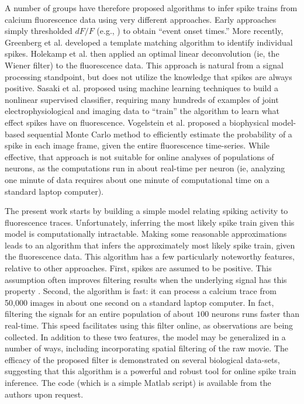 \documentclass{article}
\begin{document}
A number of groups have therefore proposed algorithms to infer spike trains from calcium fluorescence data using very different approaches.  Early approaches simply thresholded $dF/F$ (e.g., \cite{Schwartz98,Mao01}) to obtain ``event onset times.''  More recently, Greenberg et al. \cite{GreenbergKerr08} developed a  template matching algorithm to identify individual spikes. %
Holekamp et al. \cite{HolekampHoly08} then applied an optimal linear deconvolution (ie, the Wiener filter) to the fluorescence data.  This approach is natural from a signal processing standpoint, but does not utilize the knowledge that spikes are always positive.  Sasaki et al. \cite{SasakiIkegaya08} proposed using machine learning techniques to build a nonlinear supervised classifier, requiring many hundreds of examples of joint electrophysiological and imaging data to ``train'' the algorithm to learn what effect spikes have on fluorescence.  Vogelstein et al. \cite{VogelsteinPaninski09} proposed a biophysical model-based sequential Monte Carlo method to efficiently estimate the probability of a spike in each image frame, given the entire fluorescence time-series.  While effective, that approach is not suitable for online analyses of populations of neurons, as the computations run in about real-time per neuron (ie, analyzing one minute of data requires about one minute of computational time on a standard laptop computer).

The present work starts by building a simple model relating spiking activity to fluorescence traces. Unfortunately, inferring the most likely spike train given this model is computationally intractable.  Making some reasonable approximations leads to an algorithm that infers the approximately most likely spike train, given the fluorescence data.  This algorithm has a few particularly noteworthy features, relative to other approaches.  First, spikes are assumed to be positive.  This assumption often improves filtering results when the underlying signal has this property \cite{PortugalVicente94, MarkhamConchello99, LeeSeung99, LLS04, OGradyPearlmutter06, HuysPaninski06, Cunningham08, PaninskiWu09}.  Second, the algorithm is fast: it can process a calcium trace from 50,000 images in about one second on a standard laptop computer. In fact, filtering the signals for an entire population of about $100$ neurons runs faster than real-time. This speed facilitates using this filter online, as observations are being collected. In addition to these two features, the model may be generalized in a number of ways, including incorporating spatial filtering of the raw movie. The efficacy of the proposed filter is demonstrated on several biological data-sets, suggesting that this algorithm is a powerful and robust tool for online spike train inference.  The code (which is a simple Matlab script) is available from the authors upon request.
\end{document}
